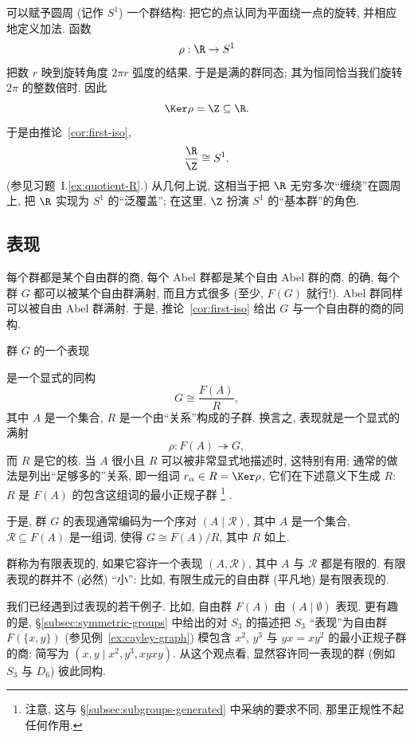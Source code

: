 \begin{example}
\label{ex:R-Z-circle}
可以赋予圆周 (记作 $S^1$) 一个群结构: 把它的点认同为平面绕一点的旋转, 并相应地定义加法. 函数
\[
\rho : \R \to S^1
\]
把数 $r$ 映到旋转角度 $2\pi r$ 弧度的结果, 于是是满的群同态; 其为恒同恰当我们旋转 $2\pi$ 的整数倍时. 因此
\[
\Ker \rho = \Z \subseteq \R.
\]
于是由推论~\ref{cor:first-iso},
\[
\frac{\R}{\Z} \cong S^1.
\]
(参见习题~I.\ref{ex:quotient-R}.) 从几何上说, 这相当于把 $\R$ 无穷多次``缠绕''在圆周上, 把 $\R$ 实现为 $S^1$ 的``泛覆盖''; 在这里, $\Z$ 扮演 $S^1$ 的``基本群''的角色.
\end{example}

\subsection{表现}
\label{subsec:presentations}

每个群都是某个自由群的商, 每个 Abel 群都是某个自由 Abel 群的商. 的确, 每个群 $G$ 都可以被某个自由群满射, 而且方式很多 (至少, $F(G)$ 就行!). Abel 群同样可以被自由 Abel 群满射. 于是, 推论~\ref{cor:first-iso} 给出 $G$ 与一个自由群的商的同构.

群 $G$ 的一个表现%

是一个显式的同构
\[
G \cong \frac{F(A)}{R},
\]
其中 $A$ 是一个集合, $R$ 是一个由``关系''构成的子群. 换言之, 表现就是一个显式的满射
\[
\rho : F(A) \twoheadrightarrow G,
\]
而 $R$ 是它的核. 当 $A$ 很小且 $R$ 可以被非常显式地描述时, 这特别有用; 通常的做法是列出``足够多的''关系, 即一组词 $r_{\alpha} \in R = \Ker \rho$, 它们在下述意义下生成 $R$: $R$ 是 $F(A)$ 的包含这组词的最小正规子群%
\footnote{注意, 这与 \S\ref{subsec:subgroups-generated} 中采纳的要求不同, 那里正规性不起任何作用.}%
.

于是, 群 $G$ 的表现通常编码为一个序对 $(A \mid \mathcal{R})$, 其中 $A$ 是一个集合, $\mathcal{R} \subseteq F(A)$ 是一组词, 使得 $G \cong F(A)/R$, 其中 $R$ 如上.

群称为有限表现的, 如果它容许一个表现 $(A, \mathcal{R})$, 其中 $A$ 与 $\mathcal{R}$ 都是有限的. 有限表现的群并不 (必然) ``小'': 比如, 有限生成元的自由群 (平凡地) 是有限表现的.

我们已经遇到过表现的若干例子. 比如, 自由群 $F(A)$ 由 $(A \mid \emptyset)$ 表现. 更有趣的是, \S\ref{subsec:symmetric-groups} 中给出的对 $S_3$ 的描述把 $S_3$ ``表现''为自由群 $F(\{x, y\})$ (参见例~\ref{ex:cayley-graph}) 模包含 $x^2$, $y^3$ 与 $yx = xy^2$ 的最小正规子群的商: 简写为 $(x, y \mid x^2, y^3, xyxy)$. 从这个观点看, 显然容许同一表现的群 (例如 $S_3$ 与 $D_6$) 彼此同构.

